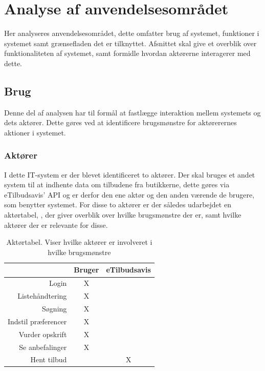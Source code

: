 \section{Analyse af anvendelsesområdet}\label{sec:anvendelses}
Her analyseres anvendelsesområdet, dette omfatter brug af systemet, funktioner i systemet samt grænsefladen det er tilknyttet.\citep{OOA&D2001}
Afsnittet skal give et overblik over funktionaliteten af systemet, samt formidle hvordan aktørerne interagerer med dette.

\subsection{Brug}
Denne del af analysen har til formål at fastlægge interaktion mellem systemets og dets aktører.
Dette gøres ved at identificere brugsmønstre for aktørerernes aktioner i systemet.

\subsubsection*{Aktører}
I dette IT-system er der blevet identificeret to aktører.
Der skal bruges et andet system til at indhente data om tilbudene fra butikkerne, dette gøres via eTilbudsavis' API og er derfor den ene aktør og den anden værende de brugere, som benytter systemet.
For disse to aktører er der således udarbejdet en aktørtabel, , der giver overblik over hvilke brugsmønstre der er, samt hvilke aktører der er relevante for disse.

\begin{table}[h]
\centering
\begin{tabular}{rcc}
				    & Bruger               		& eTilbudsavis  \\ \hline
Login               & X		                    & 		 		\\
Listehåndtering     & X		                    & 		 		\\
Søgning             & X		                    & 		 		\\
Indstil præferencer & X		                    & 		 		\\
Vurder opskrift     & X		                    & 		 		\\
Se anbefalinger     & X		                    & 		 		\\
Hent tilbud			& 							& X				\\ \hline
\end{tabular}
\caption{Aktørtabel. Viser hvilke aktører er involveret i hvilke brugsmønstre}\label{aktortabel}
\end{table}

